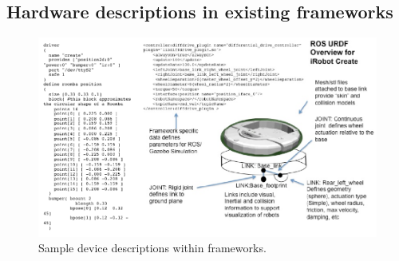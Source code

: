 \subsection{Hardware descriptions in existing frameworks}

\begin{figure}[thpb]
      \centering
      \includegraphics[width=5in]{images/URDFPS.pdf}
      \caption{Sample device descriptions within frameworks.}
      \label{psurdf}
\end{figure}



